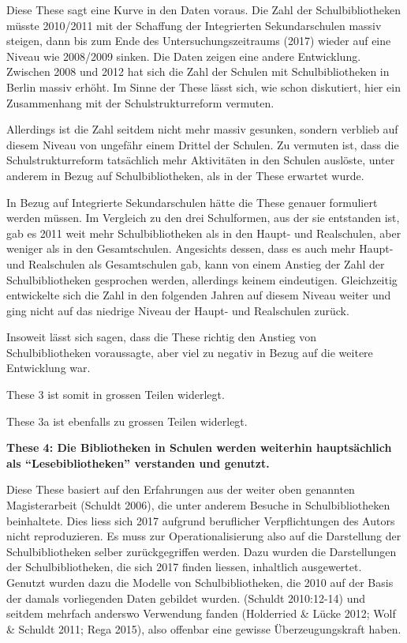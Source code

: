 \documentclass[a4paper,
fontsize=11pt,
oneside,
numbers=noperiodatend,
parskip=half-,
bibliography=totoc,
final
]{scrartcl}
\begin{document}
Diese These sagt eine Kurve in den Daten voraus. Die Zahl der
Schulbibliotheken müsste 2010/2011 mit der Schaffung der Integrierten
Sekundarschulen massiv steigen, dann bis zum Ende des
Untersuchungszeitraums (2017) wieder auf eine Niveau wie 2008/2009
sinken. Die Daten zeigen eine andere Entwicklung. Zwischen 2008 und 2012
hat sich die Zahl der Schulen mit Schulbibliotheken in Berlin massiv
erhöht. Im Sinne der These lässt sich, wie schon diskutiert, hier ein
Zusammenhang mit der Schulstrukturreform vermuten.

Allerdings ist die Zahl seitdem nicht mehr massiv gesunken, sondern
verblieb auf diesem Niveau von ungefähr einem Drittel der Schulen. Zu
vermuten ist, dass die Schulstrukturreform tatsächlich mehr Aktivitäten
in den Schulen auslöste, unter anderem in Bezug auf Schulbibliotheken,
als in der These erwartet wurde.

In Bezug auf Integrierte Sekundarschulen hätte die These genauer
formuliert werden müssen. Im Vergleich zu den drei Schulformen, aus der
sie entstanden ist, gab es 2011 weit mehr Schulbibliotheken als in den
Haupt- und Realschulen, aber weniger als in den Gesamtschulen.
Angesichts dessen, dass es auch mehr Haupt- und Realschulen als
Gesamtschulen gab, kann von einem Anstieg der Zahl der Schulbibliotheken
gesprochen werden, allerdings keinem eindeutigen. Gleichzeitig
entwickelte sich die Zahl in den folgenden Jahren auf diesem Niveau
weiter und ging nicht auf das niedrige Niveau der Haupt- und Realschulen
zurück.

Insoweit lässt sich sagen, dass die These richtig den Anstieg von
Schulbibliotheken voraussagte, aber viel zu negativ in Bezug auf die
weitere Entwicklung war.

These 3 ist somit in grossen Teilen widerlegt.

These 3a ist ebenfalls zu grossen Teilen widerlegt.

\textbf{These 4: Die Bibliotheken in Schulen werden weiterhin hauptsächlich als
\enquote{Lesebibliotheken} verstanden und genutzt.}

Diese These basiert auf den Erfahrungen aus der weiter oben genannten
Magisterarbeit (Schuldt 2006), die unter anderem Besuche in
Schulbibliotheken beinhaltete. Dies liess sich 2017 aufgrund beruflicher
Verpflichtungen des Autors nicht reproduzieren. Es muss zur
Operationalisierung also auf die Darstellung der Schulbibliotheken
selber zurückgegriffen werden. Dazu wurden die Darstellungen der
Schulbibliotheken, die sich 2017 finden liessen, inhaltlich ausgewertet.
Genutzt wurden dazu die Modelle von Schulbibliotheken, die 2010 auf der
Basis der damals vorliegenden Daten gebildet wurden. (Schuldt
2010:12-14) und seitdem mehrfach anderswo Verwendung fanden (Holderried
\& Lücke 2012; Wolf \& Schuldt 2011; Rega 2015), also offenbar eine
gewisse Überzeugungskraft haben.
\end{document}
